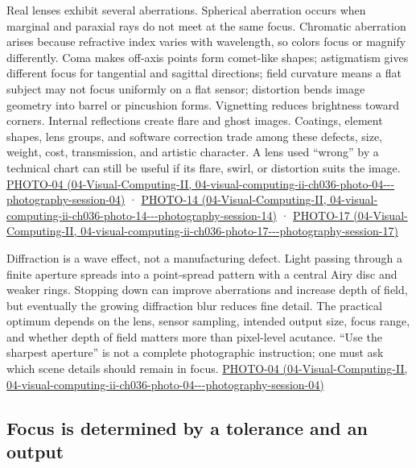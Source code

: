 Real lenses exhibit several aberrations. Spherical aberration occurs when marginal and paraxial rays do not meet at the same focus. Chromatic aberration arises because refractive index varies with wavelength, so colors focus or magnify differently. Coma makes off-axis points form comet-like shapes; astigmatism gives different focus for tangential and sagittal directions; field curvature means a flat subject may not focus uniformly on a flat sensor; distortion bends image geometry into barrel or pincushion forms. Vignetting reduces brightness toward corners. Internal reflections create flare and ghost images. Coatings, element shapes, lens groups, and software correction trade among these defects, size, weight, cost, transmission, and artistic character. A lens used ``wrong'' by a technical chart can still be useful if its flare, swirl, or distortion suits the image. \href{../04-Visual-Computing-II/main.pdf\#nameddest=04-visual-computing-ii-ch036-photo-04---photography-session-04}{PHOTO-04 (04-Visual-Computing-II, 04-visual-computing-ii-ch036-photo-04-\/-\/-photography-session-04)} · \href{../04-Visual-Computing-II/main.pdf\#nameddest=04-visual-computing-ii-ch036-photo-14---photography-session-14}{PHOTO-14 (04-Visual-Computing-II, 04-visual-computing-ii-ch036-photo-14-\/-\/-photography-session-14)} · \href{../04-Visual-Computing-II/main.pdf\#nameddest=04-visual-computing-ii-ch036-photo-17---photography-session-17}{PHOTO-17 (04-Visual-Computing-II, 04-visual-computing-ii-ch036-photo-17-\/-\/-photography-session-17)}

Diffraction is a wave effect, not a manufacturing defect. Light passing through a finite aperture spreads into a point-spread pattern with a central Airy disc and weaker rings. Stopping down can improve aberrations and increase depth of field, but eventually the growing diffraction blur reduces fine detail. The practical optimum depends on the lens, sensor sampling, intended output size, focus range, and whether depth of field matters more than pixel-level acutance. ``Use the sharpest aperture'' is not a complete photographic instruction; one must ask which scene details should remain in focus. \href{../04-Visual-Computing-II/main.pdf\#nameddest=04-visual-computing-ii-ch036-photo-04---photography-session-04}{PHOTO-04 (04-Visual-Computing-II, 04-visual-computing-ii-ch036-photo-04-\/-\/-photography-session-04)}

\subsection{Focus is determined by a tolerance and an output}\label{03-visual-computing-i-ch003-focus-is-determined-by-a-tolerance-and-an-output}

